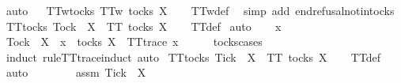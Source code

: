 \ auto%
\endisatagproof
{\isafoldproof}%
%
\isadelimproof
\ \isanewline
%
\endisadelimproof
\isanewline
{}\isamarkupfalse%
\ TT{}w{\isacharunderscore}tocks{\isacharcolon}\ {\isachardoublequoteopen}TT{}w\ {\isacharparenleft}tocks\ X{\isacharparenright}{\isachardoublequoteclose}\isanewline
%
\isadelimproof
\ \ %
\endisadelimproof
%
\isatagproof
{}\isamarkupfalse%
\ TT{}w{\isacharunderscore}def\ \isamarkupfalse%
\ {\isacharparenleft}simp\ add{\isacharcolon}\ end{\isacharunderscore}refusal{\isacharunderscore}notin{\isacharunderscore}tocks{\isacharparenright}%
\endisatagproof
{\isafoldproof}%
%
\isadelimproof
\isanewline
%
\endisadelimproof
\isanewline
{}\isamarkupfalse%
\ TT{}{\isacharunderscore}tocks{\isacharcolon}\ {\isachardoublequoteopen}Tock\ {\isasymnotin}\ X\ {\isasymLongrightarrow}\ TT{}\ {\isacharparenleft}tocks\ X{\isacharparenright}{\isachardoublequoteclose}\isanewline
%
\isadelimproof
\ \ %
\endisadelimproof
%
\isatagproof
{}\isamarkupfalse%
\ TT{}{\isacharunderscore}def\isanewline
{}\isamarkupfalse%
\ auto\isanewline
\ \ \isamarkupfalse%
\ x\isanewline
\ \ \isamarkupfalse%
\ {\isachardoublequoteopen}Tock\ {\isasymnotin}\ X\ {\isasymLongrightarrow}\ x\ {\isasymin}\ tocks\ X\ {\isasymLongrightarrow}\ TT{}{\isacharunderscore}trace\ x{\isachardoublequoteclose}\isanewline
\ \ \ \ \isamarkupfalse%
\ tocks{\isachardot}cases\ \isamarkupfalse%
\ {\isacharparenleft}induct\ rule{\isacharcolon}TT{}{\isacharunderscore}trace{\isachardot}induct{\isacharcomma}\ auto{\isacharparenright}\isanewline
{}\isamarkupfalse%
%
\endisatagproof
{\isafoldproof}%
%
\isadelimproof
\isanewline
%
\endisadelimproof
\isanewline
{}\isamarkupfalse%
\ TT{}{\isacharunderscore}tocks{\isacharcolon}\ {\isachardoublequoteopen}Tick\ {\isasymin}\ X\ {\isasymLongrightarrow}\ TT{}\ {\isacharparenleft}tocks\ X{\isacharparenright}{\isachardoublequoteclose}\isanewline
%
\isadelimproof
\ \ %
\endisadelimproof
%
\isatagproof
{}\isamarkupfalse%
\ TT{}{\isacharunderscore}def\isanewline
{}\isamarkupfalse%
\ auto\isanewline
\ \ \isamarkupfalse%
\ {\isasymrho}\isanewline
\ \ \isamarkupfalse%
\ assm{\isacharcolon}\ {\isachardoublequoteopen}Tick\ {\isasymin}\ X{\isachardoublequoteclose}\isanewline
\ \ \isamarkupfalse%
